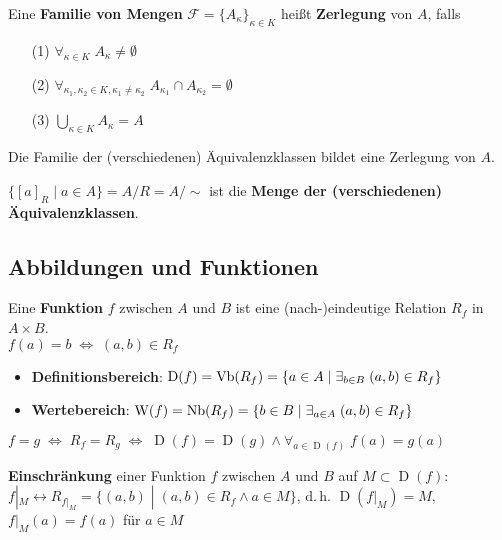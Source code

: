 \linie
\pagebreak

Eine \textbf{Familie von Mengen} $\mathcal{F} = \{A_\kappa\}_{\kappa \in K}$
heißt \textbf{Zerlegung} von $A$, falls

\begin{itemize}
    \item[(1)] $\forall_{\kappa \in K}\; A_\kappa \not= \emptyset$

    \item[(2)] $\forall_{\kappa_1, \kappa_2 \in K, \kappa_1 \not= \kappa_2}\;
    A_{\kappa_1} \cap A_{\kappa_2} = \emptyset$

    \item[(3)] $\bigcup_{\kappa \in K} A_\kappa = A$
\end{itemize}

Die Familie der (verschiedenen) Äquivalenzklassen bildet eine Zerlegung von
$A$.

$\{[a]_R \;|\; a \in A\} = A/R = A/\!\!\sim$ ist die \textbf{Menge der
(verschiedenen) Äquivalenzklassen}.

\subsection{%
    Abbildungen und Funktionen%
}

Eine \textbf{Funktion} $f$ zwischen $A$ und $B$ ist eine (nach-)eindeutige
Relation $R_f$ in $A \times B$. \\
$f(a) = b \;\Leftrightarrow\; (a, b) \in R_f$

\begin{itemize}
    \item \textbf{Definitionsbereich}:
    $\operatorname{D}(f) = \operatorname{Vb}(R_f) =
    \{a \in A \;|\; \exists_{b \in B}\; (a,b) \in R_f\}$

    \item \textbf{Wertebereich}:
    $\operatorname{W}(f) = \operatorname{Nb}(R_f) =
    \{b \in B \;|\; \exists_{a \in A}\; (a,b) \in R_f\}$
\end{itemize}

$f = g \;\Leftrightarrow\; R_f = R_g \;\Leftrightarrow\;
\operatorname{D}(f) = \operatorname{D}(g) \land
\forall_{a \in \operatorname{D}(f)}\; f(a) = g(a)$

\textbf{Einschränkung} einer Funktion $f$ zwischen $A$ und $B$ auf
$M \subset \operatorname{D}(f)$: \\
$f|_M \leftrightarrow R_{f|_M} = \{(a,b) \;|\; (a,b) \in R_f \land a \in M\}$,
d.\,h. $\operatorname{D}(f|_M) = M$, $f|_{M}(a) = f(a)$ für $a \in M$

